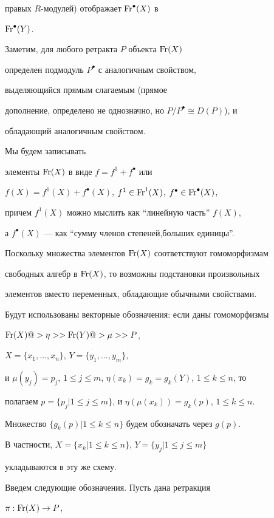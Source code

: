 правых $R$-модулей) отображает $\operatorname{Fr}^{\bullet}(X)$ в


$\operatorname{Fr}^{\bullet}(Y)$.


Заметим, для любого ретракта $P$ объекта $\operatorname{Fr}(X)$


определен подмодуль $P^{\bullet}$ с аналогичным свойством,


выделяющийся прямым слагаемым (прямое


дополнение, определено не однозначно, но $P/P^{\bullet}\cong D(P)$), и


обладающий аналогичным свойством.


Мы будем записывать


элементы $\operatorname{Fr}(X)$ в виде $f=f^1+f^{\bullet}$ или


$f(X)=f^1(X)+f^{\bullet}(X)$, $f^1\in\Fr^1(X)$, $f^{\bullet}\in


\Fr^{\bullet}(X)$,


причем $f^1(X)$ можно мыслить как ``линейную часть'' $f(X)$,


а $f^{\bullet}(X)$ --- как ``сумму членов степеней,больших единицы''.


Поскольку множества элементов $\operatorname{Fr}(X)$ соответствуют гомоморфизмам


свободных алгебр в $\operatorname{Fr}(X)$, то возможны подстановки произвольных


элементов вместо переменных, обладающие обычными свойствами.


Будут использованы векторные обозначения: если даны гомоморфизмы


$


\Fr(X)@>{\eta}>> \Fr(Y)


@>{\mu}>> P $,


$X=\{x_1,\dotsc,x_n\}$, $Y=\{y_1,\dotsc,y_m\},


$


и $\mu(y_j)=p_j$, $1\le j\le m$, $\eta(x_k)=g_k=g_k(Y)$, $1\le k\le n$, то


полагаем $p=\{p_j|1\le j\le m\}$, и $\eta(\mu(x_k))=g_k(p)$, $1\le k\le n$.


Множество $\{g_k(p)|1\le k\le n\}$ будем обозначать через $g(p)$.


В частности, $X=\{x_k|1\le k \le n\}$, $Y=\{y_j|1\le j\le m\}$


укладываются в эту же схему.





Введем следующие обозначения. Пусть дана ретракция


$\pi :\operatorname{Fr}(X) \to P $,


